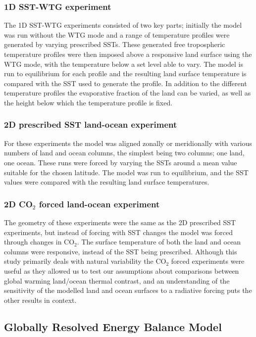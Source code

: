 \subsubsection{1D SST-WTG experiment}
The 1D SST-WTG experiments consisted of two key parts; initially the model was 
run without the WTG mode and a range of temperature profiles were generated by 
varying prescribed SSTs. These generated free tropospheric temperature profiles 
were then imposed above a responsive land surface using the WTG mode, with the 
temperature below a set level able to vary. The model is run to equilibrium for 
each profile and the resulting land surface temperature is compared with the SST 
used to generate the profile.  In addition to the different temperature profiles 
the evaporative fraction of the land can be varied, as well as the height below 
which the temperature profile is fixed.

\subsubsection{2D prescribed SST land-ocean experiment}
For these experiments the model was aligned zonally or meridionally with various 
numbers of land and ocean columns, the simplest being two columns; one land, one 
ocean. These runs were forced by varying the SSTs around a mean value suitable 
for the chosen latitude. The model was run to equilibrium, and the SST values 
were compared with the resulting land surface temperatures.

\subsubsection{2D CO$_2$ forced land-ocean experiment}
The geometry of these experiments were the same as the 2D prescribed SST 
experiments, but instead of forcing with SST changes the model was forced 
through changes in CO$_2$. The surface temperature of both the land and ocean 
columns were responsive, instead of the SST being prescribed. Although this 
study primarily deals with natural variability the CO$_2$ forced experiments 
were useful as they allowed us to test our assumptions about comparisons between 
global warming land/ocean thermal contrast, and an understanding of the 
sensitivity of the modelled land and ocean surfaces to a radiative forcing puts 
the other results in context.

\subsection{Globally Resolved Energy Balance Model}

